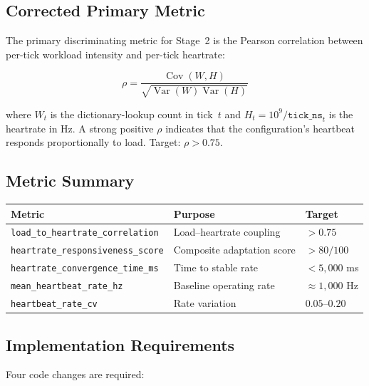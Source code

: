 \subsection{Corrected Primary Metric}

The primary discriminating metric for Stage~2 is the Pearson correlation
between per-tick workload intensity and per-tick heartrate:

\begin{equation}
  \rho = \frac{\operatorname{Cov}(W, H)}{\sqrt{\operatorname{Var}(W)\operatorname{Var}(H)}}
\end{equation}

where $W_t$ is the dictionary-lookup count in tick~$t$ and $H_t = 10^9 /
\texttt{tick\_ns}_t$ is the heartrate in Hz. A strong positive $\rho$
indicates that the configuration's heartbeat responds proportionally to load.
Target: $\rho > 0.75$.

\subsection{Metric Summary}

\begin{center}
\begin{tabular}{lll}
\toprule
Metric & Purpose & Target \\
\midrule
\texttt{load\_to\_heartrate\_correlation} & Load--heartrate coupling & $> 0.75$ \\
\texttt{heartrate\_responsiveness\_score} & Composite adaptation score & $> 80/100$ \\
\texttt{heartrate\_convergence\_time\_ms} & Time to stable rate & $< 5{,}000$ ms \\
\texttt{mean\_heartbeat\_rate\_hz} & Baseline operating rate & $\approx 1{,}000$ Hz \\
\texttt{heartbeat\_rate\_cv} & Rate variation & $0.05$--$0.20$ \\
\bottomrule
\end{tabular}
\end{center}

\subsection{Implementation Requirements}

Four code changes are required:

